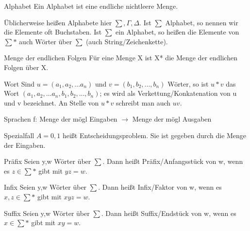 \documentclass[avery5371]{flashcards}
\begin{document}


\begin{flashcard}[Definition]{Alphabet}
Ein Alphabet ist eine endliche nichtleere Menge.

Üblicherweise heißen Alphabete hier $\sum, \Gamma, \Delta$. Ist $\sum$ Alphabet, so nennen wir die Elemente oft Buchstaben. Ist $\sum$ ein Alphabet, so heißen die Elemente von $\sum*$ auch Wörter über $\sum$ (auch String/Zeichenkette).
\end{flashcard}


\begin{flashcard}[Definition]{Menge der endlichen Folgen}
    Für eine Menge X ist X* die Menge der endlichen Folgen über X.
\end{flashcard}


\begin{flashcard}[Definition]{Wort}
Sind $u=(a_1, a_2, ...a_n)$ und $v=(b_1, b_2,...,b_n)$ Wörter, so ist $u*v$ das Wort $(a_1,a_2,...a_n,b_1,b_2,...,b_n)$; es wird als Verkettung/Konkatenation von u und v bezeichnet.
An Stelle von $u*v$ schreibt man auch $uv$.
\end{flashcard}


\begin{flashcard}[Definition]{Sprachen}
f: Menge der mögl Eingaben $\rightarrow$ Menge der mögl Ausgaben

Spezialfall $A={0,1}$ heißt Entscheidungsproblem. Sie ist gegeben durch die Menge der Eingaben. 
\end{flashcard}


\begin{flashcard}[Definition]{Präfix}
Seien y,w Wörter über $\sum$. Dann heißt Präfix/Anfangsstück von w, wenn es $z\in\sum*$ gibt mit $yz=w$.
\end{flashcard}


\begin{flashcard}[Definition]{Infix}
Seien y,w Wörter über $\sum$. Dann heißt Infix/Faktor von w, wenn es $x,z \in \sum*$ gibt mit $xyz=w$.
\end{flashcard}


\begin{flashcard}[Definition]{Suffix}
Seien y,w Wörter über $\sum$. Dann heißt Suffix/Endstück von w, wenn es $x\in \sum*$ gibt mit $xy=w$.
\end{flashcard}
\end{document}
